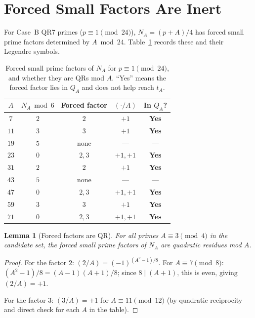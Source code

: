 \documentclass[12pt]{amsart}
\newtheorem{lemma}[theorem]{Lemma}
\theoremstyle{definition}
\theoremstyle{remark}
\begin{document}
\section{Forced Small Factors Are Inert}\label{sec:forced}

For Case~B QR7 primes ($p \equiv 1 \pmod{24}$),
$N_A = (p+A)/4$ has forced small prime factors determined by $A \bmod 24$.
Table~\ref{tab:forced} records these and their Legendre symbols.

\begin{table}[ht]
\centering
\caption{Forced small prime factors of $N_A$ for $p \equiv 1 \pmod{24}$,
and whether they are QRs mod $A$.
``Yes'' means the forced factor lies in $Q_A$ and does not help reach $t_A$.}
\label{tab:forced}
\begin{tabular}{@{}ccccc@{}}
\toprule
$A$ & $N_A \bmod 6$ & Forced factor & $({\cdot}/A)$ & In $Q_A$? \\
\midrule
$7$  & $2$ & $2$ & $+1$ & \textbf{Yes} \\
$11$ & $3$ & $3$ & $+1$ & \textbf{Yes} \\
$19$ & $5$ & none & --- & --- \\
$23$ & $0$ & $2,3$ & $+1,+1$ & \textbf{Yes} \\
$31$ & $2$ & $2$ & $+1$ & \textbf{Yes} \\
$43$ & $5$ & none & --- & --- \\
$47$ & $0$ & $2,3$ & $+1,+1$ & \textbf{Yes} \\
$59$ & $3$ & $3$ & $+1$ & \textbf{Yes} \\
$71$ & $0$ & $2,3$ & $+1,+1$ & \textbf{Yes} \\
\bottomrule
\end{tabular}
\end{table}

\begin{lemma}[Forced factors are QR]\label{lem:forced-qr}
For all primes $A \equiv 3 \pmod{4}$ in the candidate set,
the forced small prime factors of $N_A$ are quadratic residues mod $A$.
\end{lemma}

\begin{proof}
For the factor $2$: $(2/A) = (-1)^{(A^2-1)/8}$.
For $A \equiv 7 \pmod{8}$: $(A^2-1)/8 = (A-1)(A+1)/8$;
since $8 \mid (A+1)$, this is even, giving $(2/A) = +1$.

For the factor $3$: $(3/A) = +1$ for $A \equiv 11 \pmod{12}$
(by quadratic reciprocity and direct check for each $A$ in the table).
\end{proof}
\end{document}
